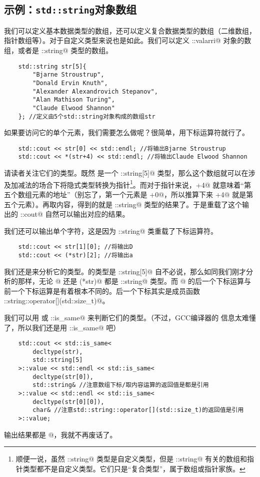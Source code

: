 \subsection*{示例：\texttt{std::string}对象数组}
我们可以定义基本数据类型的数组，还可以定义复合数据类型的数组（二维数组，指针数组等）。对于自定义类型来说也是如此。我们可以定义 \lstinline@std::valarri@ 对象的数组，或者是 \lstinline@std::string@ 类型的数组。\par
\begin{lstlisting}
    std::string str[5]{
        "Bjarne Stroustrup",
        "Donald Ervin Knuth",
        "Alexander Alexandrovich Stepanov",
        "Alan Mathison Turing",
        "Claude Elwood Shannon"
    }; //定义由5个std::string对象构成的数组str
\end{lstlisting}
如果要访问它的单个元素，我们需要怎么做呢？很简单，用下标运算符就行了。
\begin{lstlisting}
    std::cout << str[0] << std::endl; //将输出Bjarne Stroustrup
    std::cout << *(str+4) << std::endl; //将输出Claude Elwood Shannon
\end{lstlisting}
请读者关注它们的类型。既然 \lstinline@str@ 是一个 \lstinline@std::string[5]@ 类型，那么这个数组就可以在涉及加减法的场合下将隐式类型转换为指针\footnote{顺便一说，虽然 \lstinline@std::string@ 类型是自定义类型，但是 \lstinline@std::string@ 有关的数组和指针类型都不是自定义类型。它们只是``复合类型''，属于数组或指针家族。}。而对于指针来说，\lstinline@str+4@ 就意味着``第五个数组元素的地址''（别忘了，第一个元素是 \lstinline@str+0@，所以推算下来 \lstinline@str+4@ 就是第五个元素）。再取内容，得到的就是 \lstinline@std::string@ 类型的结果了。于是重载了这个输出的 \lstinline@std::cout@ 自然可以输出对应的结果。\par\pagebreak
我们还可以输出单个字符，这是因为 \lstinline@std::string@ 类重载了下标运算符。
\begin{lstlisting}
    std::cout << str[1][0]; //将输出D
    std::cout << (*str)[2]; //将输出a
\end{lstlisting}
我们还是来分析它的类型。\lstinline@str@ 的类型是 \lstinline@std::string[5]@ 自不必说，那么如同我们刚才分析的那样，无论 \lstinline@str[1]@ 还是 \lstinline@(*str)@ 都是 \lstinline@std::string@ 类型。而 \lstinline@str[1][0]@ 的后一个下标运算与前一个下标运算是有着根本不同的。后一个下标其实是成员函数 \lstinline@std::string::operator[](std::size_t)@。\par
我们可以用 \lstinline@typeid@ 或 \lstinline@std::is_same@ 来判断它们的类型。（不过，GCC编译器的 \lstinline@typeid@ 信息太难懂了，所以我们还是用 \lstinline@std::is_same@ 吧）
\begin{lstlisting}
    std::cout << std::is_same<
        decltype(str),
        std::string[5]
    >::value << std::endl << std::is_same<
        decltype(str[0]),
        std::string& //注意数组下标/取内容运算的返回值是都是引用
    >::value << std::endl << std::is_same<
        decltype(str[0][0]),
        char& //注意std::string::operator[](std::size_t)的返回值是引用
    >::value;
\end{lstlisting}
输出结果都是 @，我就不再废话了。\par
